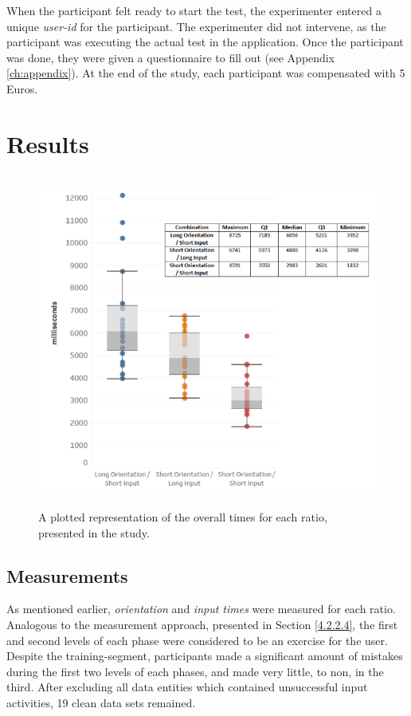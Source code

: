 When the participant felt ready to start the test, the experimenter entered a unique \textit{user-id} for the participant. The experimenter did not intervene, as the participant was executing the actual test in the application. Once the participant was done, they were given a questionnaire to fill out (see Appendix \ref{ch:appendix}). At the end of the study, each participant was compensated with 5 Euros.

\section{Results} \label{5.4}

\begin{figure}[t!]
\centering
\includegraphics[width=13cm, height=11cm]{Chapters/graphics/Combinations.png}
\caption{A plotted representation of the overall times for each ratio, presented in the study.}
\label{fig:combination}
\end{figure}

\subsection{Measurements}

 As mentioned earlier, \textit{orientation} and \textit{input times} were measured for each ratio. Analogous to the measurement approach, presented in Section \ref{4.2.2.4}, the first and second levels of each phase were considered to be an exercise for the user. Despite the training-segment, participants made a significant amount of mistakes during the first two levels of each phases, and made very little, to non, in the third. After excluding all data entities which contained unsuccessful input activities, 19 clean data sets remained. \\

